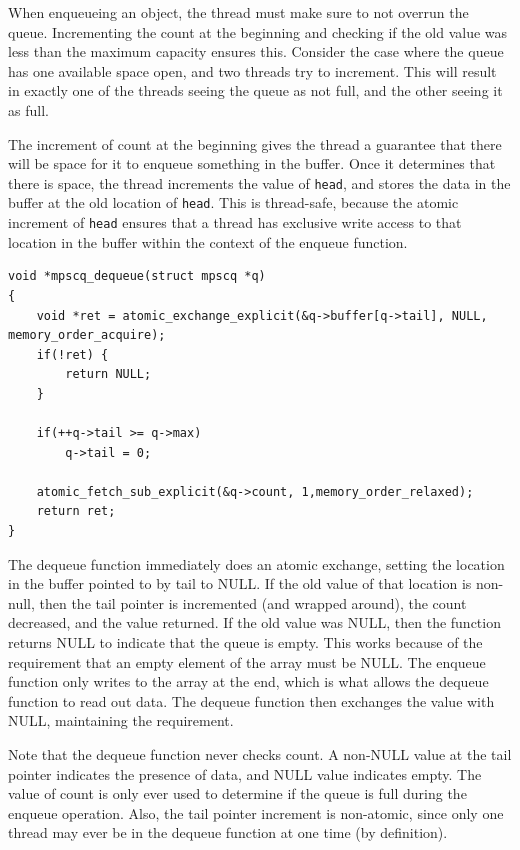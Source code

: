 \documentclass[12pt]{article}
\begin{document}
When enqueueing an object, the thread must make sure to not overrun the queue.
Incrementing the count at the beginning and checking if the old value was less than
the maximum capacity ensures this. Consider the case where the queue has one available
space open, and two threads try to increment. This will result in exactly one of the
threads seeing the queue as not full, and the other seeing it as full.

The increment of count at the beginning gives the thread a guarantee that there will be
space for it to enqueue something in the buffer. Once it determines that there is space,
the thread increments the value of \texttt{head}, and stores the data in the buffer at
the old location of \texttt{head}. This is thread-safe, because the atomic increment
of \texttt{head} ensures that a thread has exclusive write access to that location in the
buffer within the context of the enqueue function.

\begin{minipage}{\linewidth}
	\onehalfspacing
	\vspace{5mm}
\begin{lstlisting}[label=lst-dequeue, caption={Implementation of \texttt{dequeue} function, with memory orderings.}]
void *mpscq_dequeue(struct mpscq *q)
{
	void *ret = atomic_exchange_explicit(&q->buffer[q->tail], NULL, memory_order_acquire);
	if(!ret) {
		return NULL;
	}

	if(++q->tail >= q->max)
		q->tail = 0;
	
	atomic_fetch_sub_explicit(&q->count, 1,memory_order_relaxed);
	return ret;
}
\end{lstlisting}
	\doublespacing
\end{minipage}

The dequeue function immediately
does an atomic exchange, setting the location in the buffer pointed to by tail to NULL. If
the old value of that location is non-null, then the tail pointer is incremented (and
wrapped around), the count decreased, and the value returned. If the old value was NULL,
then the function returns NULL to indicate that the queue is empty. This works because
of the requirement that an empty element of the array must be NULL. The enqueue function
only writes to the array at the end, which is what allows the dequeue function to
read out data. The dequeue function then exchanges the value with NULL, maintaining
the requirement.

Note that the dequeue function never checks count. A non-NULL value at the tail pointer
indicates the presence of data, and NULL value indicates empty. The value of count is only
ever used to determine if the queue is full during the enqueue operation. Also, the tail pointer
increment is non-atomic, since only one thread may ever be in the dequeue function at one
time (by definition).
\end{document}
